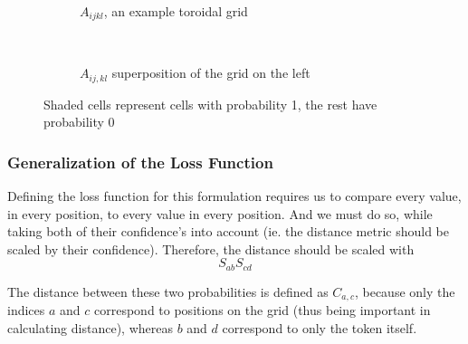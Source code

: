 \begin{figure}[htpb]
    \centering
    \begin{subfigure}[t]{0.5\textwidth}
    \begin{center}
    \end{center}
    \caption{$A_{ijkl}$, an example toroidal grid}
    \end{subfigure}%
    ~
    \begin{subfigure}[t]{0.5\textwidth}
    \begin{center}
    \end{center}
    \caption{$A_{ij,kl}$ superposition of the grid on the left}
    \end{subfigure}

    \caption{Shaded cells represent cells with probability 1, the rest have probability 0}
    \label{fig:superpositionExample}
\end{figure}

\subsubsection{Generalization of the Loss Function}%
\label{ssub:generalization_of_the_loss_function}

Defining the loss function for this formulation requires us to compare every value, in every position, to every value in every position. And we must do so, while taking both of their confidence's into account (ie. the distance metric should be scaled by their confidence). Therefore, the distance should be scaled with
\begin{equation}
    S_{ab}S_{cd}
\end{equation}

The distance between these two probabilities is defined as $C_{a,c}$, because only the indices $a$ and $c$ correspond to positions on the grid (thus being important in calculating distance), whereas $b$ and $d$ correspond to only the token itself.

